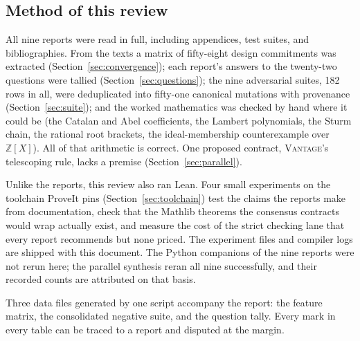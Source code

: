 \documentclass[11pt,a4paper]{article}
\newcommand{\Vt}{\textsc{Vantage}}
\newcommand{\Z}{\mathbb Z}
\theoremstyle{definition}
\begin{document}
\subsection{Method of this review}
All nine reports were read in full, including appendices, test suites, and bibliographies. From the texts a matrix of fifty-eight design commitments was extracted (Section~\ref{sec:convergence}); each report's answers to the twenty-two questions were tallied (Section~\ref{sec:questions}); the nine adversarial suites, 182 rows in all, were deduplicated into fifty-one canonical mutations with provenance (Section~\ref{sec:suite}); and the worked mathematics was checked by hand where it could be (the Catalan and Abel coefficients, the Lambert polynomials, the Sturm chain, the rational root brackets, the ideal-membership counterexample over $\Z[X]$). All of that arithmetic is correct. One proposed contract, \Vt's telescoping rule, lacks a premise (Section~\ref{sec:parallel}).

Unlike the reports, this review also ran Lean. Four small experiments on the toolchain ProveIt pins (Section~\ref{sec:toolchain}) test the claims the reports make from documentation, check that the Mathlib theorems the consensus contracts would wrap actually exist, and measure the cost of the strict checking lane that every report recommends but none priced. The experiment files and compiler logs are shipped with this document. The Python companions of the nine reports were not rerun here; the parallel synthesis reran all nine successfully, and their recorded counts are attributed on that basis.

Three data files generated by one script accompany the report: the feature matrix, the consolidated negative suite, and the question tally. Every mark in every table can be traced to a report and disputed at the margin.
\end{document}
